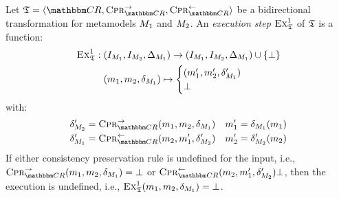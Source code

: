 \begin{definition}
    Let $\transformation{T} = \tupled{\consistencyrelationset{CR}, \consistencypreservationrule{\consistencyrelationset{CR}}^{\rightarrow}, \consistencypreservationrule{\consistencyrelationset{CR}}^{\leftarrow}}$ be a bidirectional transformation for metamodels $M_{1}$ and $M_{2}$.
    An \emph{execution step} $\textsc{Ex}_{\mathfrak{T}}^1$ of $\mathfrak{T}$ is a function:
    \begin{align*}
        \textsc{Ex}_{\mathfrak{T}}^1 : \; & (I_{M_{1}}, I_{M_{2}}, \Delta_{M_{1}}) \rightarrow (I_{M_{1}}, I_{M_{2}}, \Delta_{M_{1}}) \cup \{ \bot \} \\
        & (m_{1}, m_{2}, \delta_{M_{1}}) \mapsto 
        \begin{cases} 
            (m_{1}', m_{2}', \delta_{M_{1}}') \\
            \bot
        \end{cases}
    \end{align*}
    with:
    \begin{align*}
        & \change{\metamodel{M}{2}}' = \consistencypreservationrule{\consistencyrelationset{CR}}^{\rightarrow}(\model{m}{1}, \model{m}{2}, \change{\metamodel{M}{1}}) %
        & \model{m}{1}' = \change{\metamodel{M}{1}}(\model{m}{1}) \\
        & \change{\metamodel{M}{1}}' = \consistencypreservationrule{\consistencyrelationset{CR}}^{\leftarrow}(\model{m}{2}, \model{m}{1}', \change{\metamodel{M}{2}}') %
        & \model{m}{2}' = \change{\metamodel{M}{2}}'(\model{m}{2})
    \end{align*}
    If either consistency preservation rule is undefined for the input, i.e., $\consistencypreservationrule{\consistencyrelationset{CR}}^{\rightarrow}(\model{m}{1}, \model{m}{2}, \change{\metamodel{M}{1}}) = \bot$ or $\consistencypreservationrule{\consistencyrelationset{CR}}^{\leftarrow}(\model{m}{2}, \model{m}{1}', \change{\metamodel{M}{2}}') \bot$, then the execution is undefined, i.e., $\textsc{Ex}_{\mathfrak{T}}^1(m_{1}, m_{2}, \delta_{M_{1}}) = \bot$.

\end{definition}
